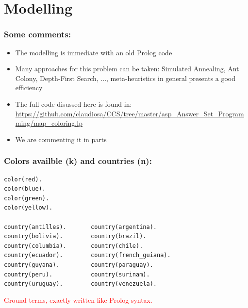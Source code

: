 \documentclass{beamer}
\begin{document}
\section{Modelling}
\begin{frame}[fragile] 
	\frametitle{Some comments:}
	
\begin{block}{}
  \begin{itemize}

  \item The modelling is immediate with an old Prolog code
  \item Many approaches for this problem can be taken: Simulated Annealing, Ant Colony, Depth-First Search, ..., meta-heuristics in general presents a good efficiency
  \item The full code disussed here is found in:\\ \url{https://github.com/claudiosa/CCS/tree/master/asp_Answer_Set_Programming/map_coloring.lp}
  \item We are commenting it in parts

   \end{itemize}
 \end{block}
	
	
\end{frame}
\begin{frame}[fragile] 
\frametitle{Colors availble (k) and countries (n):}
	
{\small
\begin{verbatim}
color(red).
color(blue).
color(green).
color(yellow).

country(antilles).       country(argentina).
country(bolivia).        country(brazil).
country(columbia).       country(chile).
country(ecuador).        country(french_guiana).
country(guyana).         country(paraguay).
country(peru).           country(surinam).
country(uruguay).        country(venezuela).

\end{verbatim}
}	
\textcolor{red}{Ground terms, exactly written like Prolog syntax.}
\end{frame}


\end{document}
